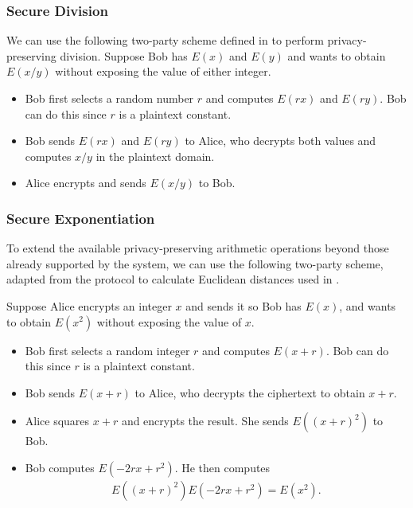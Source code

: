 \subsubsection{Secure Division}
We can use the following two-party scheme defined in \cite{boukoros_lightweight_2017} to perform privacy-preserving division.
Suppose Bob has $E(x)$ and $E(y)$ and wants to obtain $E(x/y)$ without exposing the value of either integer.
\begin{itemize}
	\item Bob first selects a random number $r$ and computes $E(rx)$ and $E(ry)$. Bob can do this since $r$ is a plaintext constant.
	\item Bob sends $E(rx)$ and $E(ry)$ to Alice, who decrypts both values and computes $x/y$ in the plaintext domain.
	\item Alice encrypts and sends $E(x/y)$ to Bob.
\end{itemize}

\subsubsection{Secure Exponentiation}
\label{ssec:exponentiationprotocol}
To extend the available privacy-preserving arithmetic operations beyond those already supported by the system, we can use the following two-party scheme, adapted from the protocol to calculate Euclidean distances used in \cite{hutchison_privacy-preserving_2009}.

Suppose Alice encrypts an integer $x$ and sends it so Bob has $E(x)$, and wants to obtain $E(x^2)$ without exposing the value of $x$.
\begin{itemize}
	\item Bob first selects a random integer $r$ and computes $E(x+r)$. Bob can do this since $r$ is a plaintext constant.
	\item Bob sends $E(x+r)$ to Alice, who decrypts the ciphertext to obtain $x+r$.
	\item Alice squares $x+r$ and encrypts the result. She sends $E((x+r)^2)$ to Bob.
	\item Bob computes $E(-2rx + r^2)$. He then computes
	\begin{align*}
		E((x+r)^2)E(-2rx + r^2) = E(x^2).
	\end{align*}
\end{itemize}

